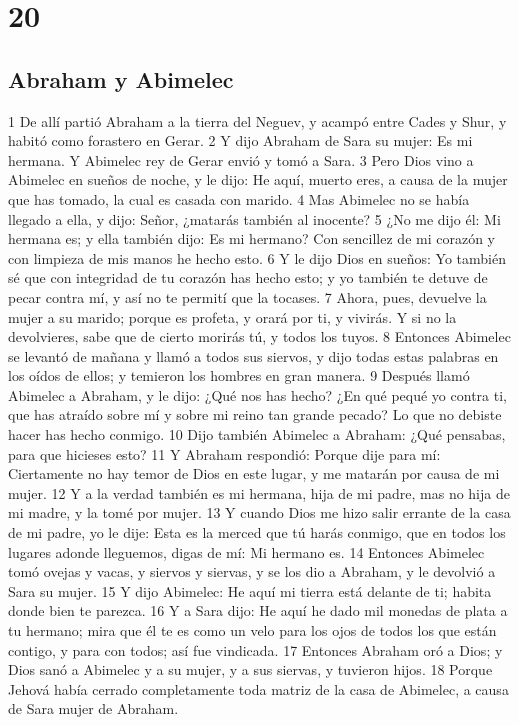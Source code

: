 \chapter{20}

\section*{Abraham y Abimelec}

1 De allí partió Abraham a la tierra del Neguev, y acampó entre Cades y Shur, y habitó como forastero en Gerar.
2 Y dijo Abraham de Sara su mujer: Es mi hermana. Y Abimelec rey de Gerar envió y tomó a Sara.
3 Pero Dios vino a Abimelec en sueños de noche, y le dijo: He aquí, muerto eres, a causa de la mujer que has tomado, la cual es casada con marido.
4 Mas Abimelec no se había llegado a ella, y dijo: Señor, ¿matarás también al inocente?
5 ¿No me dijo él: Mi hermana es; y ella también dijo: Es mi hermano? Con sencillez de mi corazón y con limpieza de mis manos he hecho esto.
6 Y le dijo Dios en sueños: Yo también sé que con integridad de tu corazón has hecho esto; y yo también te detuve de pecar contra mí, y así no te permití que la tocases.
7 Ahora, pues, devuelve la mujer a su marido; porque es profeta, y orará por ti, y vivirás. Y si no la devolvieres, sabe que de cierto morirás tú, y todos los tuyos.
8 Entonces Abimelec se levantó de mañana y llamó a todos sus siervos, y dijo todas estas palabras en los oídos de ellos; y temieron los hombres en gran manera.
9 Después llamó Abimelec a Abraham, y le dijo: ¿Qué nos has hecho? ¿En qué pequé yo contra ti, que has atraído sobre mí y sobre mi reino tan grande pecado? Lo que no debiste hacer has hecho conmigo.
10 Dijo también Abimelec a Abraham: ¿Qué pensabas, para que hicieses esto?
11 Y Abraham respondió: Porque dije para mí: Ciertamente no hay temor de Dios en este lugar, y me matarán por causa de mi mujer.
12 Y a la verdad también es mi hermana, hija de mi padre, mas no hija de mi madre, y la tomé por mujer.
13 Y cuando Dios me hizo salir errante de la casa de mi padre, yo le dije: Esta es la merced que tú harás conmigo, que en todos los lugares adonde lleguemos, digas de mí: Mi hermano es.
14 Entonces Abimelec tomó ovejas y vacas, y siervos y siervas, y se los dio a Abraham, y le devolvió a Sara su mujer.
15 Y dijo Abimelec: He aquí mi tierra está delante de ti; habita donde bien te parezca.
16 Y a Sara dijo: He aquí he dado mil monedas de plata a tu hermano; mira que él te es como un velo para los ojos de todos los que están contigo, y para con todos; así fue vindicada.
17 Entonces Abraham oró a Dios; y Dios sanó a Abimelec y a su mujer, y a sus siervas, y tuvieron hijos.
18 Porque Jehová había cerrado completamente toda matriz de la casa de Abimelec, a causa de Sara mujer de Abraham.

